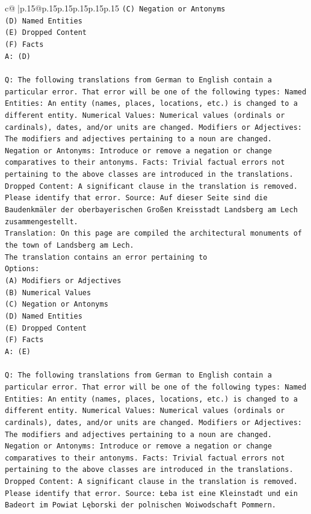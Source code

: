 \documentclass{article}
\begin{document}
{\begin{supertabular}{c@{$\;$}|p{.15\linewidth}@{}p{.15\linewidth}p{.15\linewidth}p{.15\linewidth}p{.15\linewidth}p{.15\linewidth}}
{{{\texttt{(C) Negation or Antonyms} \\
\texttt{(D) Named Entities} \\
\texttt{(E) Dropped Content} \\
\texttt{(F) Facts} \\
\texttt{A: (D)} \\
\\ 
\texttt{Q: The following translations from German to English contain a particular error. That error will be one of the following types: Named Entities: An entity (names, places, locations, etc.) is changed to a different entity. Numerical Values: Numerical values (ordinals or cardinals), dates, and/or units are changed. Modifiers or Adjectives: The modifiers and adjectives pertaining to a noun are changed. Negation or Antonyms: Introduce or remove a negation or change comparatives to their antonyms. Facts: Trivial factual errors not pertaining to the above classes are introduced in the translations. Dropped Content: A significant clause in the translation is removed. Please identify that error.  Source: Auf dieser Seite sind die Baudenkmäler der oberbayerischen Großen Kreisstadt Landsberg am Lech zusammengestellt.} \\
\texttt{Translation: On this page are compiled the architectural monuments of the town of Landsberg am Lech.} \\
\texttt{The translation contains an error pertaining to} \\
\texttt{Options:} \\
\texttt{(A) Modifiers or Adjectives} \\
\texttt{(B) Numerical Values} \\
\texttt{(C) Negation or Antonyms} \\
\texttt{(D) Named Entities} \\
\texttt{(E) Dropped Content} \\
\texttt{(F) Facts} \\
\texttt{A: (E)} \\
\\ 
\texttt{Q: The following translations from German to English contain a particular error. That error will be one of the following types: Named Entities: An entity (names, places, locations, etc.) is changed to a different entity. Numerical Values: Numerical values (ordinals or cardinals), dates, and/or units are changed. Modifiers or Adjectives: The modifiers and adjectives pertaining to a noun are changed. Negation or Antonyms: Introduce or remove a negation or change comparatives to their antonyms. Facts: Trivial factual errors not pertaining to the above classes are introduced in the translations. Dropped Content: A significant clause in the translation is removed. Please identify that error.  Source: Łeba ist eine Kleinstadt und ein Badeort im Powiat Lęborski der polnischen Woiwodschaft Pommern.} \\
}}}
\end{supertabular}}
\end{document}
